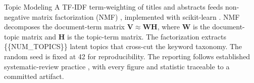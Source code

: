 \documentclass[
  ignorenonframetext,
]{beamer}
\begin{document}
\begin{frame}[allowframebreaks]{Topic Modeling}
\label{topic-modeling}
A TF-IDF term-weighting of titles and abstracts 
feeds non-negative matrix factorization (NMF) ,
implemented with scikit-learn . NMF decomposes
the document-term matrix \(\mathbf{V} \approx \mathbf{W} \mathbf{H}\),
where \(\mathbf{W}\) is the document-topic matrix and \(\mathbf{H}\) is
the topic-term matrix. The factorization extracts \{\{NUM\_TOPICS\}\}
latent topics that cross-cut the keyword taxonomy. The random seed is
fixed at 42 for reproducibility. The reporting follows established
systematic-review practice , with every figure and
statistic traceable to a committed artifact.
\end{frame}
\end{document}
